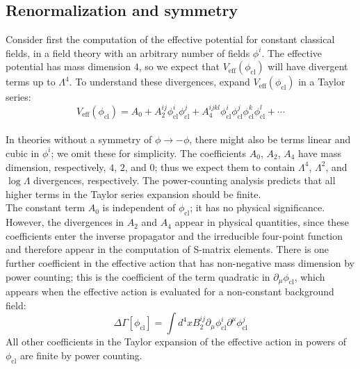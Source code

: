 \documentclass[cyan]{elegantnote}
\begin{document}
\subsection{Renormalization and symmetry}
Consider first the computation of the effective potential for constant classical fields, in a field theory with an arbitrary number of fields $\phi^i$. The effective potential has mass dimension $4$, so we expect that $V_{\mathrm{eff}}(\phi_{\mathrm{cl}})$ will have divergent terms up to $\Lambda^4$. To understand these divergences,
expand $V_{\mathrm{eff}}(\phi_{\mathrm{cl}})$ in a Taylor series:
\[V_{\mathrm{eff}}(\phi_{\mathrm{cl}}) = A_0 + A_2^{ij}\phi_{\mathrm{cl}}^i \phi_{\mathrm{cl}}^j + A_4^{ijkl} \phi_{\mathrm{cl}}^i \phi_{\mathrm{cl}}^j \phi_{\mathrm{cl}}^k \phi_{\mathrm{cl}}^l + \cdots\]
\\
In theories without a symmetry of $\phi \to -\phi$, there might also be terms linear and cubic in $\phi^i$; we omit these for simplicity. The coefficients $A_0$, $A_2$, $A_4$ have mass dimension, respectively, $4$, $2$, and $0$; thus we expect them to contain $\Lambda^4$, $\Lambda^2$, and $\log \Lambda$ divergences, respectively. The power-counting analysis predicts that all higher terms in the Taylor series expansion should be finite.
\\
The constant term $A_0$ is independent of $\phi_{\mathrm{cl}}$; it has no physical significance. However, the divergences in $A_2$ and $A_4$ appear in physical quantities, since these coefficients enter the inverse propagator and the irreducible four-point function and therefore appear in the computation of S-matrix elements. There is one further coefficient in the effective action that has non-negative mass dimension by power counting; this is the coefficient of the term quadratic in $\partial_{\mu} \phi_{\mathrm{cl}}$, which appears when the effective action is evaluated for a non-constant background field:
\[\Delta \Gamma [\phi_{\mathrm{cl}}] = \int d^4x B_2^{ij} \partial_{\mu} \phi_{\mathrm{cl}}^i \partial^{\mu} \phi_{\mathrm{cl}}^j\]
All other coefficients in the Taylor expansion of the effective action in powers of $\phi_{\mathrm{cl}}$ are finite by power counting.
\\
\end{document}
